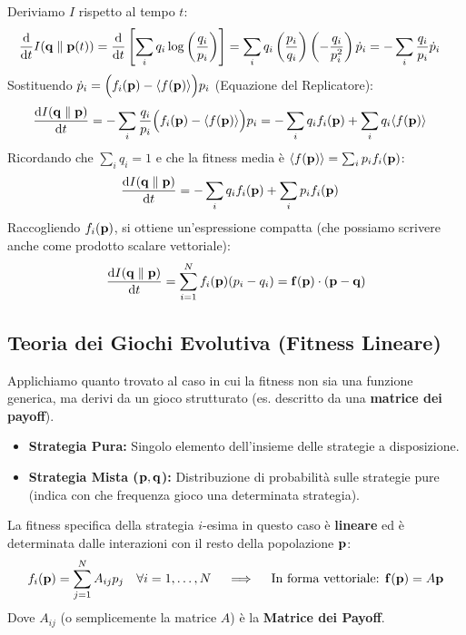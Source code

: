 \documentclass[openany]{book}
\theoremstyle{definition}
\theoremstyle{remark}
\begin{document}
Deriviamo $I$ rispetto al tempo $t$:
\begin{align*}
    \dv{t} I(\vb{q} \parallel \vb{p}(t)) &= \dv{t} \left[ \sum_i q_i \log\left(\frac{q_i}{p_i}\right) \right] = \sum_i q_i \left( \frac{p_i}{q_i} \right) \left( -\frac{q_i}{p_i^2} \right) \dot{p}_i = - \sum_i \frac{q_i}{p_i} \dot{p}_i
\end{align*}
Sostituendo $\dot{p}_i = \Big(f_i(\vb{p}) - \langle f(\vb{p}) \rangle \Big) p_i$ (Equazione del Replicatore):
\begin{align*}
    \dv{I(\vb{q} \parallel \vb{p})}{t} &= - \sum_i \frac{q_i}{p_i} \Big(f_i(\vb{p}) - \langle f(\vb{p}) \rangle\Big) p_i = - \sum_i q_i f_i(\vb{p}) + \sum_i q_i \langle f(\vb{p}) \rangle
\end{align*}
Ricordando che $\sum_i q_i = 1$ e che la fitness media è $\langle f(\vb{p}) \rangle = \sum_i p_i f_i(\vb{p})$:
\begin{align*}
    \dv{I(\vb{q} \parallel \vb{p})}{t} &= - \sum_i q_i f_i(\vb{p}) + \sum_i p_i f_i(\vb{p})
\end{align*}
Raccogliendo $f_i(\vb{p})$, si ottiene un'espressione compatta (che possiamo scrivere anche come prodotto scalare vettoriale):
\begin{equation}
    \dv{I(\vb{q} \parallel \vb{p})}{t} = \sum_{i=1}^N f_i(\vb{p}) (p_i - q_i) = \vb{f}(\vb{p}) \cdot (\vb{p} - \vb{q})
\end{equation}

\subsection*{Teoria dei Giochi Evolutiva (Fitness Lineare)}

Applichiamo quanto trovato al caso in cui la fitness non sia una funzione generica, ma derivi da un gioco strutturato (es. descritto da una \textbf{matrice dei payoff}).

\begin{itemize}
    \item \textbf{Strategia Pura:} Singolo elemento dell'insieme delle strategie a disposizione.
    \item \textbf{Strategia Mista ($\vb{p}, \vb{q}$):} Distribuzione di probabilità sulle strategie pure (indica con che frequenza gioco una determinata strategia).
\end{itemize}

La fitness specifica della strategia $i$-esima in questo caso è \textbf{lineare} ed è determinata dalle interazioni con il resto della popolazione $\vb{p}$:
\begin{equation*}
    f_i(\vb{p}) = \sum_{j=1}^N A_{ij} p_j \quad \forall i=1,\dots,N \quad \implies \quad \text{In forma vettoriale: } \vb{f}(\vb{p}) = A\vb{p}
\end{equation*}
Dove $A_{ij}$ (o semplicemente la matrice $A$) è la \textbf{Matrice dei Payoff}.
\end{document}
